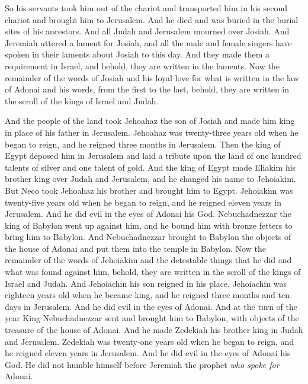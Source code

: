 \begin{biblechapter}
\verse So his servants took him out of the chariot and transported him in his second chariot and brought him to Jerusalem. And he died and was buried in the burial sites of his ancestors. And all Judah and Jerusalem mourned over Josiah.
\verse And Jeremiah uttered a lament for Josiah, and all the male and female singers have spoken in their laments about Josiah to this day. And they made them a requirement in Israel, and behold, they are written in the laments.
\verse Now the remainder of the words of Josiah and his loyal love for what is written in the law of Adonai
\verse and his words, from the first to the last, behold, they are written in the scroll of the kings of Israel and Judah.
\end{biblechapter}

\begin{biblechapter} %
 And the people of the land took Jehoahaz the son of Josiah and made him king in place of his father in Jerusalem.
\verse Jehoahaz was twenty-three years old when he began to reign, and he reigned three months in Jerusalem.
\verse Then the king of Egypt deposed him in Jerusalem and laid a tribute upon the land of one hundred talents of silver and one talent of gold.
\verse And the king of Egypt made Eliakim his brother king over Judah and Jerusalem, and he changed his name to Jehoiakim. But Neco took Jehoahaz his brother and brought him to Egypt.
\verse Jehoiakim was twenty-five years old when he began to reign, and he reigned eleven years in Jerusalem. And he did evil in the eyes of Adonai his God.
\verse Nebuchadnezzar the king of Babylon went up against him, and he bound him with bronze fetters to bring him to Babylon.
\verse And Nebuchadnezzar brought to Babylon the objects of the house of Adonai and put them into the temple in Babylon.
\verse Now the remainder of the words of Jehoiakim and the detestable things that he did and what was found against him, behold, they are written in the scroll of the kings of Israel and Judah. And Jehoiachin his son reigned in his place.
\verse Jehoiachin was eighteen years old when he became king, and he reigned three months and ten days in Jerusalem. And he did evil in the eyes of Adonai.
\verse And at the turn of the year King Nebuchadnezzar sent and brought him to Babylon, with objects of the treasure of the house of Adonai. And he made Zedekiah his brother king in Judah and Jerusalem.
\verse Zedekiah was twenty-one years old when he began to reign, and he reigned eleven years in Jerusalem.
\verse And he did evil in the eyes of Adonai his God. He did not humble himself before Jeremiah the prophet \textit{who spoke for} Adonai.

\end{biblechapter}
